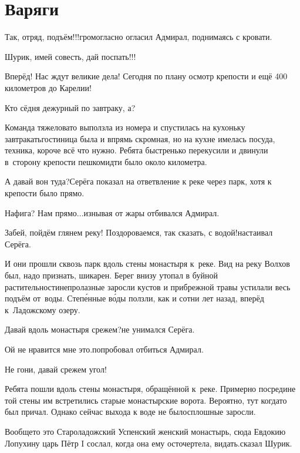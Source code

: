 \chapter{Варяги}
\vepsianrose
\fancyhead[LE]{\fancyplain{}{\bfseries \parttitle}}
\fancyhead[RO]{\fancyplain{}{\bfseries \rightmark}}

\diagdash Так, отряд, подъём!!!\mdash громогласно огласил Адмирал, поднимаясь с кровати.

\diagdash Шурик, имей совесть, дай поспать!!!

\diagdash Вперёд! Нас ждут великие дела! Сегодня по плану осмотр крепости и ещё 400 километров до Карелии!

\diagdash Кто сёдня дежурный по завтраку, а?

Команда тяжеловато выползла из номера и спустилась на кухоньку завтракать\mdash гостиница была и впрямь скромная, но на кухне имелась посуда, техника, короче всё что нужно. Ребята быстренько перекусили и двинули в~сторону крепости пешком\mdash идти было около километра.

\diagdash А давай вон туда?\mdash Серёга показал на ответвление к реке через парк, хотя к крепости было прямо.

\diagdash Нафига? Нам прямо$\ldots$\mdash изнывая от жары отбивался Адмирал.

\diagdash Забей, пойдём глянем реку! Поздороваемся, так сказать, с водой!\mdash настаивал Серёга.

И они прошли сквозь парк вдоль стены монастыря к~реке. Вид на реку Волхов был, надо признать, шикарен. Берег внизу утопал в буйной растительности\mdash непролазные заросли кустов и прибрежной травы устилали весь подъём от~воды. Степ\'{е}нные в\'{о}ды ползли, как и сотни лет назад, вперёд к~Ладожскому озеру.

\diagdash Давай вдоль монастыря срежем?\mdash не унимался Серёга.

\diagdash Ой не нравится мне это.\mdash попробовал отбиться Адмирал.

\diagdash Не гони, давай срежем угол!

Ребята пошли вдоль стены монастыря, обращённой к~реке. Примерно посредине той стены им встретились старые монастырские ворота. Вероятно, тут когда\sdash то был причал. Однако сейчас выхода к воде не было\mdash сплошные заросли. 

\diagdash Вообще\sdash то это Староладожский Успенский женский монастырь, сюда Евдокию Лопухину царь Пётр I сослал, когда она ему осточертела, видать.\mdash сказал Шурик.

